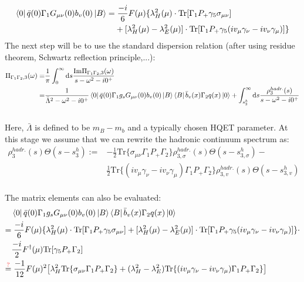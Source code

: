 \documentclass[openright,twoside,12pt,a4paper,final]{article}
\begin{document}
	\begin{align}
		\bra{0} \bar{q}(0) \Gamma_1 G_{\mu \nu}(0) b_v(0) \ket{B} =& \; \frac{-i}{6} F(\mu) \{\lambda_H^2(\mu) \cdot \mathrm{Tr}[\Gamma_1 P_+ \gamma_5 \sigma_{\mu \nu}] \nonumber \\& + [\lambda_H^2(\mu) - \lambda_E^2(\mu)] \cdot \mathrm{Tr}[\Gamma_1 P_+ \gamma_5 (i v_{\mu} \gamma_{\nu} - i v_{\nu} \gamma_{\mu})]\}
	\end{align}
	The next step will be to use the standard dispersion relation (after using residue theorem, Schwartz reflection principle,...): \\
	\begin{align}
		\Pi_{\Gamma_1 \Gamma_2,3}(\omega) =& \frac{1}{\pi} \int_0^{\infty} \mathrm{d}s \frac{\mathrm{Im} \Pi_{\Gamma_1 \Gamma_2,3}(\omega)}{s - \omega^2 - i0^+} \nonumber \\ =& \frac{1}{\bar{\Lambda}^2 - \omega^2 - i0^+} \bra{0} \bar{q}(0) \Gamma_1 g_s G_{\mu \nu}(0) b_v(0)\ket{B} \bra{B} \bar{b}_v(x) \Gamma_2 q(x) \ket{0} + \int_{s_3^h}^{\infty} \mathrm{d} s \frac{\rho_3^{hadr.}(s)}{s - \omega^2 - i0^+} 
	\end{align} \\
	Here, $\bar{\Lambda}$ is defined to be $m_B - m_b$ and a typically chosen HQET parameter.
	At this stage we assume that we can rewrite the hadronic continuum spectrum as: \\
	\begin{align}
		\rho_3^{hadr.}(s) \Theta(s - s_3^h) :=& - \frac{1}{2} \mathrm{Tr} \{\sigma_{\mu \nu} \Gamma_1 P_+  \Gamma_2\} \rho_{3,\sigma}^{hadr.}(s) \Theta(s - s_{3,\sigma}^h) - \nonumber \\& \frac{1}{2} \mathrm{Tr} \{(i v_{\mu} \gamma_{\nu} - i v_{\nu} \gamma_{\mu}) \Gamma_1 P_+  \Gamma_2\} \rho_{3,v}^{hadr.}(s) \Theta(s - s_{3,v}^h) \label{hadrSpectr}
	\end{align} \\
	The matrix elements can also be evaluated:
	\begin{align}
		&\bra{0} \bar{q}(0) \Gamma_1 g_s G_{\mu \nu}(0) b_v(0)\ket{B} \bra{B} \bar{b}_v(x) \Gamma_2 q(x) \ket{0} \nonumber \\ =& \; \frac{-i}{6} F(\mu) \{\lambda_H^2(\mu) \cdot \mathrm{Tr}[\Gamma_1 P_+ \gamma_5 \sigma_{\mu \nu}] \nonumber + [\lambda_H^2(\mu) - \lambda_E^2(\mu)] \cdot \mathrm{Tr}[\Gamma_1 P_+ \gamma_5 (i v_{\mu} \gamma_{\nu} - i v_{\nu} \gamma_{\mu})]\} \cdot \\& \frac{-i}{2} F^{\dagger}(\mu) \mathrm{Tr}[\gamma_5 P_+ \Gamma_2] \nonumber \\ \overset{\textcolor{red}{?}}{=}& \; \frac{-1}{12} F(\mu)^2 \big[\lambda_H^2 \mathrm{Tr} \{\sigma_{\mu \nu} \Gamma_1 P_+  \Gamma_2\} + (\lambda_H^2 - \lambda_E^2) \mathrm{Tr} \{(i v_{\mu} \gamma_{\nu} - i v_{\nu} \gamma_{\mu}) \Gamma_1 P_+  \Gamma_2\}\big]
	\end{align} \\
\end{document}
